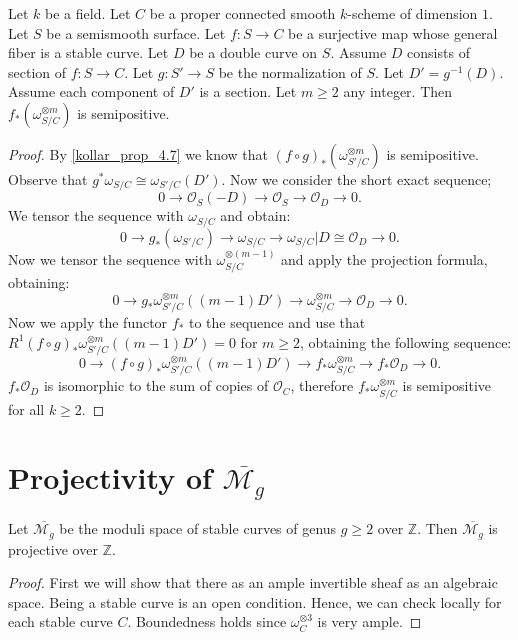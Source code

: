 \begin{lemma}[cf.\ {\cite[Theorem 4.9]{Ko90}}]
\label{kollar-theorem-4.9}
Let $k$ be a field.
Let $C$ be a proper connected smooth $k$-scheme of dimension $1$.
Let $S$ be a semismooth surface.
Let $f:S\to C$ be a surjective map whose general fiber is a stable curve.
Let $D$ be a double curve on $S$.
Assume $D$ consists of section of $f:S\to C$.
Let $g:S'\to S$ be the normalization of $S$.
Let $D'=g^{-1}(D)$.
Assume each component of $D'$ is a section.
Let $m\geq 2$ any integer.
Then $f_*(\omega_{S/C}^{\otimes m})$ is semipositive.
\begin{proof}
By \ref{kollar_prop_4.7} we know that $(f\circ g)_*(\omega_{S'/C}^{\otimes m})$ is semipositive.
Observe that $g^*\omega_{S/C}\cong \omega_{S'/C}(D')$.
Now we consider the short exact sequence;
$$0\to\mathcal{O}_{S}(-D)\to\mathcal{O}_S\to\mathcal{O}_D\to 0.$$
We tensor the sequence with $\omega_{S/C}$ and obtain:
$$0\to g_*(\omega_{S'/C})\to \omega_{S/C}\to \omega_{S/C}|D\cong \mathcal{O}_D\to 0.$$
Now we tensor the sequence with $\omega_{S/C}^{\otimes (m-1)}$ and apply the projection formula, obtaining:
$$0\to g_*\omega_{S'/C}^{\otimes m}((m-1)D')\to \omega_{S/C}^{\otimes m}\to \mathcal{O}_D\to 0.$$
 Now we apply the functor $f_*$ to the sequence and use that $R^1(f\circ g)_*\omega_{S'/C}^{\otimes m}((m-1)D')=0$ for $m\geq 2$, obtaining the following sequence:
 $$0\to (f\circ g)_*\omega_{S'/C}^{\otimes m}((m-1)D')\to f_*\omega_{S/C}^{\otimes m}\to f_*\mathcal{O}_D\to 0.$$
 $f_*\mathcal{O}_D$ is isomorphic to the sum of copies of $\mathcal{O}_C$, therefore $f_*\omega_{S/C}^{\otimes m}$ is semipositive for all $k\geq 2$. 
\end{proof}

\section{Projectivity of $\overline{\mathcal{M}_g}$}

\begin{lemma}
Let $\overline{\mathcal{M}_g}$ be the moduli space of stable curves of genus $g\geq 2$ over $\mathbb{Z}$. Then $\overline{\mathcal{M}_g}$ is projective over $\mathbb{Z}$.
\end{lemma}
\begin{proof}
First we will show that there as an ample invertible sheaf as an algebraic space. Being a stable curve is an open condition. Hence, we can check locally for each stable curve $C$. Boundedness holds since $\omega_C^{\otimes 3}$ is very ample.


\end{proof}
\end{lemma}
